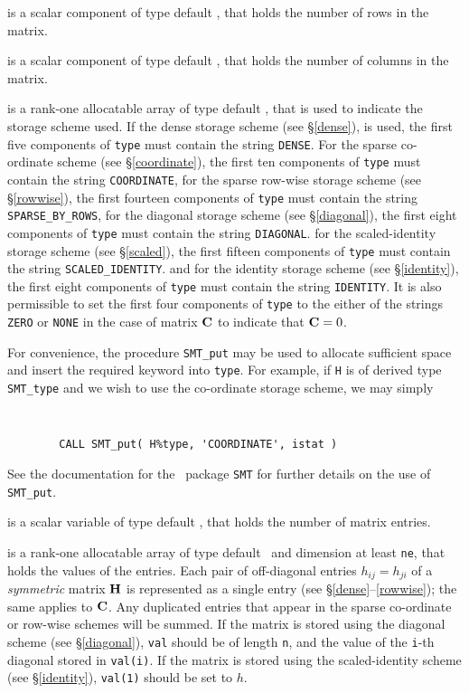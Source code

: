 \documentclass{galahad}
\begin{document}
\begin{description}

 is a scalar component of type default \integer,
that holds the number of rows in the matrix.

 is a scalar component of type default \integer,
that holds the number of columns in the matrix.

 is a rank-one allocatable array of type default \character, that
is used to indicate the storage scheme used. If the dense storage scheme
(see \S\ref{dense}), is used,
the first five components of {\tt type} must contain the
string {\tt DENSE}.
For the sparse co-ordinate scheme (see \S\ref{coordinate}),
the first ten components of {\tt type} must contain the
string {\tt COORDINATE},
for the sparse row-wise storage scheme (see \S\ref{rowwise}),
the first fourteen components of {\tt type} must contain the
string {\tt SPARSE\_BY\_ROWS},
for the diagonal storage scheme (see \S\ref{diagonal}),
the first eight components of {\tt type} must contain the
string {\tt DIAGONAL}.
for the scaled-identity storage scheme (see \S\ref{scaled}),
the first fifteen components of {\tt type} must contain the
string {\tt SCALED\_IDENTITY}.
and for the identity storage scheme (see \S\ref{identity}),
the first eight components of {\tt type} must contain the
string {\tt IDENTITY}.
It is also permissible to set
the first four components of {\tt type} to the either of the strings
{\tt ZERO} or {\tt NONE}
in the case of matrix ${\mathbf{C}}$ to indicate that ${\mathbf{C}} = 0$.

For convenience, the procedure {\tt SMT\_put}
may be used to allocate sufficient space and insert the required keyword
into {\tt type}.
For example, if {\tt H} is of derived type {\tt SMT\_type}
and we wish to use the co-ordinate storage scheme, we may simply
{\tt
\begin{verbatim}
        CALL SMT_put( H%type, 'COORDINATE', istat )
\end{verbatim}
}
\noindent
See the documentation for the \galahad\ package {\tt SMT}
for further details on the use of {\tt SMT\_put}.

 is a scalar variable of type default \integer, that
holds the number of matrix entries.

 is a rank-one allocatable array of type default \realdp\,
and dimension at least {\tt ne}, that holds the values of the entries.
Each pair of off-diagonal entries $h_{ij} = h_{ji}$ of a {\em symmetric}
matrix ${\mathbf{H}}$ is represented as a single entry
(see \S\ref{dense}--\ref{rowwise}); the same applies to ${\mathbf{C}}$.
Any duplicated entries that appear in the sparse
co-ordinate or row-wise schemes will be summed.
If the matrix is stored using the diagonal scheme (see \S\ref{diagonal}),
{\tt val} should be of length {\tt n}, and the value of the {\tt i}-th
diagonal stored in {\tt val(i)}.
If the matrix is stored using the scaled-identity scheme (see \S\ref{identity}),
{\tt val(1)} should be set to $h$.


\end{description}
\end{document}
